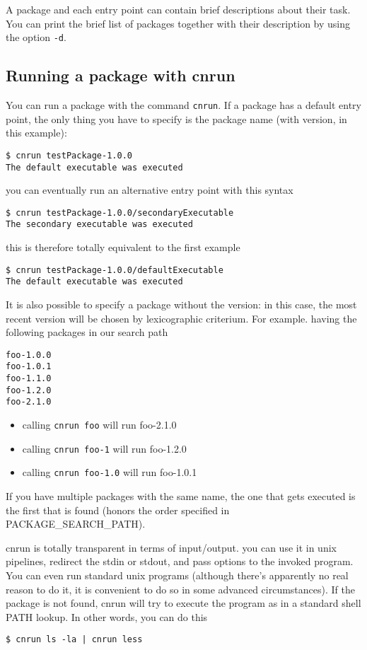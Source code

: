 A package and each entry point can contain brief descriptions about their task.
You can print the brief list of packages together with their description by using the option
\verb+-d+.

\subsection{Running a package with cnrun}

You can run a package with the command \verb+cnrun+.
If a package has a default entry point, the only thing you have to specify
is the package name (with version, in this example):
\begin{verbatim}
$ cnrun testPackage-1.0.0
The default executable was executed
\end{verbatim}

you can eventually run an alternative entry point with this syntax
\begin{verbatim}
$ cnrun testPackage-1.0.0/secondaryExecutable
The secondary executable was executed
\end{verbatim}

this is therefore totally equivalent to the first example
\begin{verbatim}
$ cnrun testPackage-1.0.0/defaultExecutable
The default executable was executed
\end{verbatim}

It is also possible to specify a package without the version: in this case,
the most recent version will be chosen by lexicographic criterium.  For
example. having the following packages in our search path
\begin{verbatim}
foo-1.0.0
foo-1.0.1
foo-1.1.0
foo-1.2.0
foo-2.1.0
\end{verbatim}

\begin{itemize}
\item calling \verb+cnrun foo+ will run foo-2.1.0
\item calling \verb+cnrun foo-1+ will run foo-1.2.0
\item calling \verb+cnrun foo-1.0+ will run foo-1.0.1
\end{itemize}

If you have multiple packages with the same name, the one that gets executed
is the first that is found (honors the order specified in
PACKAGE\_SEARCH\_PATH). 

cnrun is totally transparent in terms of input/output. you can use it in
unix pipelines, redirect the stdin or stdout, and pass options to the
invoked program. You can even run standard unix programs (although there's
apparently no real reason to do it, it is convenient to do so in some
advanced circumstances). If the package is not found, cnrun will try to
execute the program as in a standard shell PATH lookup. In other words, you
can do this
\begin{verbatim}
$ cnrun ls -la | cnrun less
\end{verbatim}


